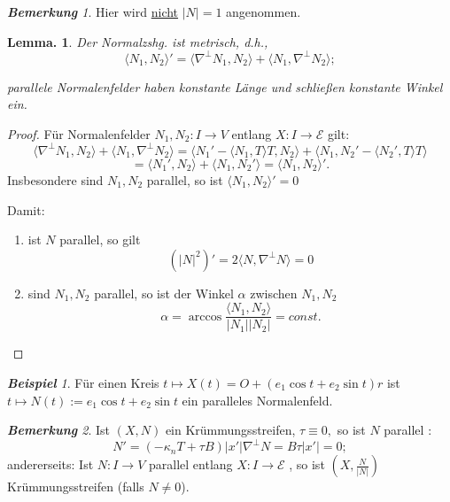 \documentclass[a4paper,oneside,11pt,DIV=12,parskip=half]{scrartcl}
\newcommand{\E}{\mathcal E}
\theoremstyle{plain}
\newtheorem{lemma}[theorem]{Lemma.}
\theoremstyle{definition}
\newtheorem{remark, definition}[theorem]{Bemerkung und Definition.}
\newtheorem{lemma, definition}[theorem]{Lemma und Definition.}
\theoremstyle{remark}
\newtheorem*{remark}{\textbf{Bemerkung}}
\newtheorem*{example}{\textbf{Beispiel}}
\newtheorem*{remark, example}{\textbf{Bemerkung und Beispiel}}
\begin{document}
\begin{remark}
	Hier wird \underline{nicht} $| N | = 1$ angenommen.
\end{remark}

\begin{lemma}
	Der Normalzshg. ist \emph{metrisch}, d.h., $$ \langle N_1,N_2 \rangle ' = \langle \nabla^\perp N_1,N_2 \rangle + \langle N_1, \nabla^\perp N_2 \rangle; $$
	
	parallele Normalenfelder haben konstante Länge und schließen konstante Winkel ein.
\end{lemma}

\begin{proof}
		
		Für Normalenfelder $N_1, N_2 : I \rightarrow V$ entlang $X: I\rightarrow \E$ gilt:
		\[ \langle \nabla^\perp N_1,N_2 \rangle + \langle N_1,\nabla^\perp N_2 \rangle = \langle N_1'- \langle N_1,T \rangle T,N_2 \rangle + \langle N_1,N_2' - \langle N_2',T \rangle T \rangle\]
		\[ =\langle N_1',N_2 \rangle + \langle N_1,N_2' \rangle = \langle N_1,N_2 \rangle ' .\]
		Insbesondere sind $N_1,N_2$ parallel, so ist $\langle N_1,N_2 \rangle ' = 0$
		
		Damit: 
		
		\begin{enumerate}
			\item  ist $N$ parallel, so gilt $$ (|N|^2)' = 2 \langle N,\nabla^\perp N \rangle = 0$$
			
			\item  sind $N_1, N_2$ parallel, so ist der Winkel $\alpha$ zwischen $N_1,N_2$
			$$ \alpha = \arccos \frac{\langle N_1,N_2 \rangle}{|N_1||N_2|}= const. $$
		\end{enumerate}
		
\end{proof}

\begin{example}
	Für einen Kreis $t \mapsto X(t) = O + (e_1 \cos t + e_2 \sin t)r$ ist $t\mapsto N(t) := e_1 \cos t + e_2 \sin t$ ein paralleles Normalenfeld.
\end{example}


\begin{remark}
	Ist $(X,N)$ ein Krümmungsstreifen, $\tau \equiv 0,$ so ist $N$ parallel : 
	\[ N' = (-\kappa_n T + \tau B)|x'| \nabla^\perp N = B\tau|x'|= 0; \]
	andererseits: Ist $N: I \rightarrow V$ parallel entlang $X: I \rightarrow \E$ , so ist $ (X,\frac{N}{|N|}) $ Krümmungsstreifen (falls $N \not = 0$).
\end{remark}
\end{document}
